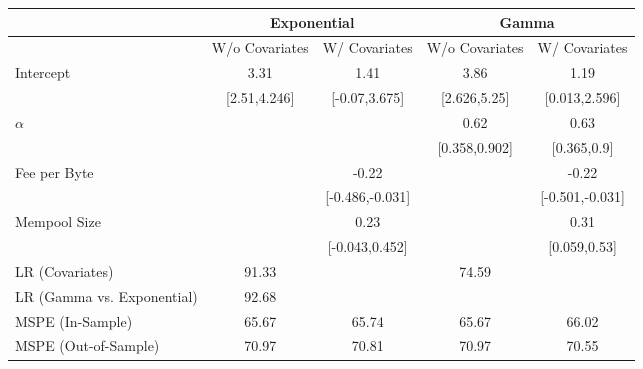 \begin{tabular}{lcccc}
  \toprule
  & \multicolumn{2}{c}{Exponential} & \multicolumn{2}{c}{Gamma}  \\ \cmidrule(lr){2-3}\cmidrule(lr){4-5}  \midrule
  & W/o Covariates & W/ Covariates & W/o Covariates & W/ Covariates \\ 
   \midrule Intercept & 3.31 & 1.41 & 3.86 & 1.19 \\ 
   & {[2.51,4.246]} & {[-0.07,3.675]} & {[2.626,5.25]} & {[0.013,2.596]} \\ 
  $\alpha$ &   &   & 0.62 & 0.63 \\ 
   &   &   & {[0.358,0.902]} & {[0.365,0.9]} \\ 
  Fee per Byte &   & -0.22 &   & -0.22 \\ 
   &   & {[-0.486,-0.031]} &   & {[-0.501,-0.031]} \\ 
  Mempool Size &   & 0.23 &   & 0.31 \\ 
   &   & {[-0.043,0.452]} &   & {[0.059,0.53]} \\ 
   \midrule LR (Covariates) & 91.33 &   & 74.59 &   \\ 
  LR (Gamma vs. Exponential) & 92.68 &   &   &   \\ 
   \midrule MSPE (In-Sample) & 65.67 & 65.74 & 65.67 & 66.02 \\ 
  MSPE (Out-of-Sample) & 70.97 & 70.81 & 70.97 & 70.55 \\ 
   \bottomrule
\end{tabular}
